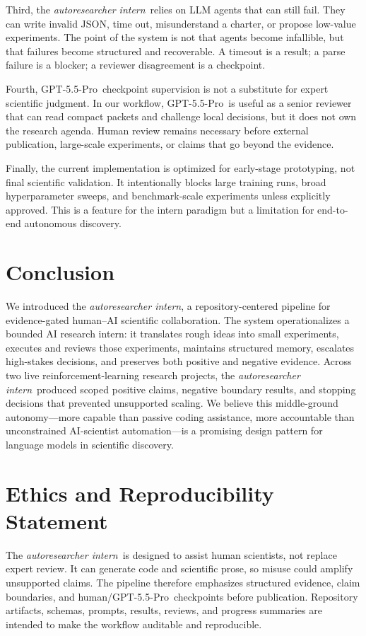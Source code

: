 \documentclass{article}
\newcommand{\intern}{\emph{autoresearcher intern}}
\newcommand{\gptpro}{GPT-5.5-Pro}
\begin{document}
Third, the \intern\ relies on LLM agents that can still fail. They can write invalid JSON, time out, misunderstand a charter, or propose low-value experiments. The point of the system is not that agents become infallible, but that failures become structured and recoverable. A timeout is a result; a parse failure is a blocker; a reviewer disagreement is a checkpoint.

Fourth, \gptpro\ checkpoint supervision is not a substitute for expert scientific judgment. In our workflow, \gptpro\ is useful as a senior reviewer that can read compact packets and challenge local decisions, but it does not own the research agenda. Human review remains necessary before external publication, large-scale experiments, or claims that go beyond the evidence.

Finally, the current implementation is optimized for early-stage prototyping, not final scientific validation. It intentionally blocks large training runs, broad hyperparameter sweeps, and benchmark-scale experiments unless explicitly approved. This is a feature for the intern paradigm but a limitation for end-to-end autonomous discovery.

\section{Conclusion}

We introduced the \intern, a repository-centered pipeline for evidence-gated human--AI scientific collaboration. The system operationalizes a bounded AI research intern: it translates rough ideas into small experiments, executes and reviews those experiments, maintains structured memory, escalates high-stakes decisions, and preserves both positive and negative evidence. Across two live reinforcement-learning research projects, the \intern\ produced scoped positive claims, negative boundary results, and stopping decisions that prevented unsupported scaling. We believe this middle-ground autonomy---more capable than passive coding assistance, more accountable than unconstrained AI-scientist automation---is a promising design pattern for language models in scientific discovery.

\section*{Ethics and Reproducibility Statement}

The \intern\ is designed to assist human scientists, not replace expert review. It can generate code and scientific prose, so misuse could amplify unsupported claims. The pipeline therefore emphasizes structured evidence, claim boundaries, and human/\gptpro\ checkpoints before publication. Repository artifacts, schemas, prompts, results, reviews, and progress summaries are intended to make the workflow auditable and reproducible.
\end{document}
